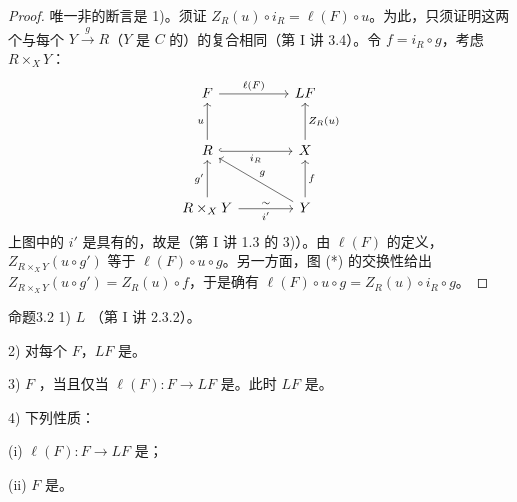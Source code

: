 \begin{proof}
唯一非的断言是 1)。须证 $Z_R(u)\circ i_R=\ell(F)\circ u$。为此，只须证明这两个与每个 $Y\xrightarrow{g}R$（$Y$ 是 $C$ 的）的复合相同（第 I 讲 3.4）。令 $f=i_R\circ g$，考虑 $R\times_XY$：
\[
\begin{tikzcd}[column sep=large,row sep=large]
F\arrow[r,"\ell(F)"]&LF\\
R\arrow[u,"u"]\arrow[r,hook,"i_R"']&X\arrow[u,"Z_R(u)"']\\
R\times_XY\arrow[u,"g'"]\arrow[r,"i'"',"\sim"]&Y\arrow[u,"f"']\arrow[ul,"g"']
\end{tikzcd}
\]
上图中的 $i'$ 是具有的，故是（第 I 讲 1.3 的 3)）。由 $\ell(F)$ 的定义， $Z_{R\times_XY}(u\circ g')$ 等于 $\ell(F)\circ u\circ g$。另一方面，图 (*) 的交换性给出 $Z_{R\times_XY}(u\circ g')=Z_R(u)\circ f$，于是确有 $\ell(F)\circ u\circ g=Z_R(u)\circ i_R\circ g$。
\end{proof}
\begin{SGAresult}{命题}{3.2}
1)  $L$ （第 I 讲 2.3.2）。
\par 2) 对每个 $F$，$LF$ 是。
\par 3)  $F$ ，当且仅当 $\ell(F):F\to LF$ 是。此时 $LF$ 是。
\par 4) 下列性质：
\par (i) $\ell(F):F\to LF$ 是；
\par (ii) $F$ 是。
\end{SGAresult}
